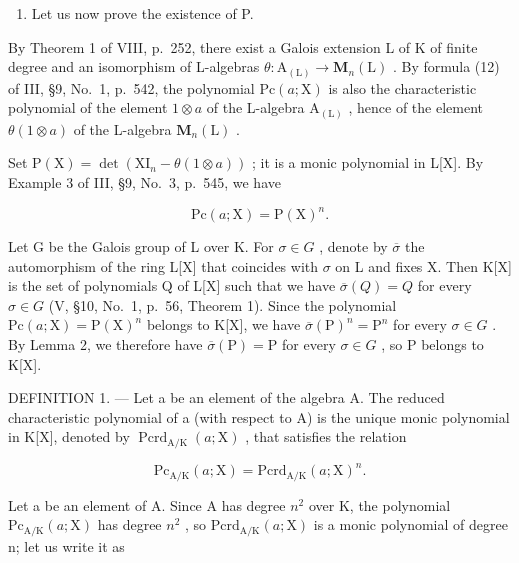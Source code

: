\begin{enumerate}
\def\labelenumi{\Alph{enumi})}
\setcounter{enumi}{1}
\tightlist
\item
  Let us now prove the existence of P.
\end{enumerate}

By Theorem 1 of VIII, p.~252, there exist a Galois extension L of K of finite degree and an isomorphism of L-algebras \(\theta : \mathrm{A}_{(\mathrm{L})} \to \mathbf{M}_n(\mathrm{L})\) . By formula (12) of III, §9, No.~1, p.~542, the polynomial \(\mathrm{Pc}(a; \mathrm{X})\) is also the characteristic polynomial of the element \(1 \otimes a\) of the L-algebra \(\mathrm{A}_{(\mathrm{L})}\) , hence of the element \(\theta(1 \otimes a)\) of the L-algebra \(\mathbf{M}_n(\mathrm{L})\) .

Set \(\mathrm{P}(\mathrm{X})=\det(\mathrm{XI}_{n}-\theta(1\otimes a))\) ; it is a monic polynomial in L{[}X{]}. By Example 3 of III, §9, No.~3, p.~545, we have

\[
\mathrm{Pc} (a; \mathrm{X}) = \mathrm{P} (\mathrm{X}) ^ {n}.\tag{19}
\]

Let G be the Galois group of L over K. For \(\sigma\in G\) , denote by \(\overline{\sigma}\) the automorphism of the ring L{[}X{]} that coincides with \(\sigma\) on L and fixes X. Then K{[}X{]} is the set of polynomials Q of L{[}X{]} such that we have \(\overline{\sigma}(Q)=Q\) for every \(\sigma\in G\) (V, §10, No.~1, p.~56, Theorem 1). Since the polynomial \(\mathrm{Pc}(a;\mathrm{X})=\mathrm{P}(\mathrm{X})^{n}\) belongs to K{[}X{]}, we have \(\overline{\sigma}(\mathrm{P})^{n}=\mathrm{P}^{n}\) for every \(\sigma\in G\) . By Lemma 2, we therefore have \(\overline{\sigma}(\mathrm{P})=\mathrm{P}\) for every \(\sigma\in G\) , so P belongs to K{[}X{]}.

DEFINITION 1. --- Let a be an element of the algebra A. The reduced characteristic polynomial of a (with respect to A) is the unique monic polynomial in K{[}X{]}, denoted by \(\operatorname{Pcrd}_{\mathrm{A}/\mathrm{K}}(a;\mathrm{X})\) , that satisfies the relation

\[
\mathrm{Pc} _ {\mathrm{A/K}} (a; \mathrm{X}) = \mathrm{Pcrd} _ {\mathrm{A/K}} (a; \mathrm{X}) ^ {n}.\tag{20}
\]

Let a be an element of A. Since A has degree \(n^{2}\) over K, the polynomial \(\mathrm{Pc}_{\mathrm{A/K}}(a;\mathrm{X})\) has degree \(n^{2}\) , so \(\mathrm{Pcrd}_{\mathrm{A/K}}(a;\mathrm{X})\) is a monic polynomial of degree n; let us write it as

